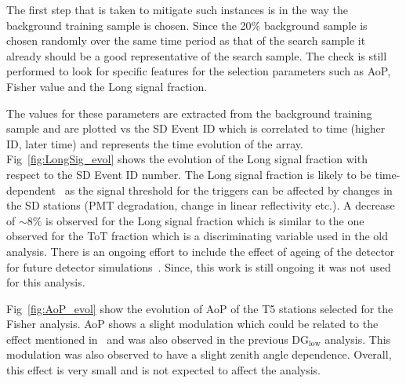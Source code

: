 The first step that is taken to mitigate such instances is in the way the background training sample is chosen. Since the 20\% background sample is chosen randomly over the same time period as that of the search sample it already should be a good representative of the search sample. The check is still performed to look for specific features for the selection parameters such as AoP, Fisher value and the Long signal fraction. 

The values for these parameters are extracted from the background training sample and are plotted vs the SD Event ID which is correlated to time (higher ID, later time) and represents the time evolution of the array. Fig~\ref{fig:LongSig_evol} shows the evolution of the Long signal fraction with respect to the SD Event ID number. The Long signal fraction is likely to be time-dependent~\cite{Sato:2011zze} as the signal threshold for the triggers can be affected by changes in the SD stations (PMT degradation, change in linear reflectivity etc.). A decrease of $\sim 8\%$ is observed for the Long signal fraction which is similar to the one observed for the ToT fraction which is a discriminating variable used in the old analysis. There is an ongoing effort to include the effect of ageing of the detector for future detector simulations~\cite{PierreAuger:2023xfj}. Since, this work is still ongoing it was not used for this analysis. 

Fig~\ref{fig:AoP_evol} show the evolution of AoP of the T5 stations selected for the Fisher analysis. AoP shows a slight modulation which could be related to the effect mentioned in~\cite{Sato:2011zze} and was also observed in the previous DG$\mathrm{_{low}}$ analysis. This modulation was also observed to have a slight zenith angle dependence. Overall, this effect is very small and is not expected to affect the analysis.

